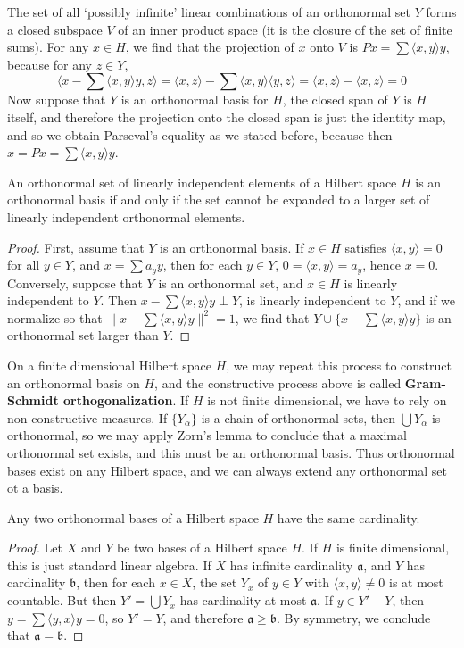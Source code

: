 The set of all `possibly infinite' linear combinations of an orthonormal set $Y$ forms a closed subspace $V$ of an inner product space (it is the closure of the set of finite sums). For any $x \in H$, we find that the projection of $x$ onto $V$ is $Px = \sum \langle x, y \rangle y$, because for any $z \in Y$,
%
\[ \langle x - \sum \langle x, y \rangle y, z \rangle = \langle x, z \rangle - \sum \langle x, y \rangle \langle y,z \rangle = \langle x, z \rangle - \langle x, z \rangle = 0 \]
%
Now suppose that $Y$ is an orthonormal basis for $H$, the closed span of $Y$ is $H$ itself, and therefore the projection onto the closed span is just the identity map, and so we obtain Parseval's equality as we stated before, because then $x = Px = \sum \langle x, y \rangle y$.

\begin{lemma}
    An orthonormal set of linearly independent elements of a Hilbert space $H$ is an orthonormal basis if and only if the set cannot be expanded to a larger set of linearly independent orthonormal elements.
\end{lemma}
\begin{proof}
    First, assume that $Y$ is an orthonormal basis. If $x \in H$ satisfies $\langle x, y \rangle = 0$ for all $y \in Y$, and $x = \sum a_y y$, then for each $y \in Y$, $0 = \langle x, y \rangle = a_y$, hence $x = 0$. Conversely, suppose that $Y$ is an orthonormal set, and $x \in H$ is linearly independent to $Y$. Then $x - \sum \langle x, y \rangle y \perp Y$, is linearly independent to $Y$, and if we normalize so that $\| x - \sum \langle x, y \rangle y \|^2 = 1$, we find that $Y \cup \{ x - \sum \langle x, y \rangle y \}$ is an orthonormal set larger than $Y$.
\end{proof}

On a finite dimensional Hilbert space $H$, we may repeat this process to construct an orthonormal basis on $H$, and the constructive process above is called {\bf Gram-Schmidt orthogonalization}. If $H$ is not finite dimensional, we have to rely on non-constructive measures. If $\{ Y_\alpha \}$ is a chain of orthonormal sets, then $\bigcup Y_\alpha$ is orthonormal, so we may apply Zorn's lemma to conclude that a maximal orthonormal set exists, and this must be an orthonormal basis. Thus orthonormal bases exist on any Hilbert space, and we can always extend any orthonormal set ot a basis.

\begin{theorem}
    Any two orthonormal bases of a Hilbert space $H$ have the same cardinality.
\end{theorem}
\begin{proof}
    Let $X$ and $Y$ be two bases of a Hilbert space $H$. If $H$ is finite dimensional, this is just standard linear algebra. If $X$ has infinite cardinality $\mathfrak{a}$, and $Y$ has cardinality $\mathfrak{b}$, then for each $x \in X$, the set $Y_x$ of $y \in Y$ with $\langle x, y \rangle \neq 0$ is at most countable. But then $Y' = \bigcup Y_x$ has cardinality at most $\mathfrak{a}$. If $y \in Y' - Y$, then $y = \sum \langle y, x \rangle y = 0$, so $Y' = Y$, and therefore $\mathfrak{a} \geq \mathfrak{b}$. By symmetry, we conclude that $\mathfrak{a} = \mathfrak{b}$.
\end{proof}

